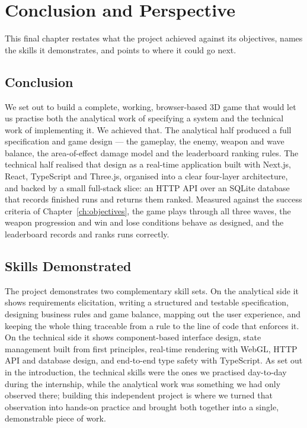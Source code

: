 \documentclass[12pt,a4paper]{report}
\begin{document}
\chapter{Conclusion and Perspective}\label{ch:conclusion}

This final chapter restates what the project achieved against its objectives,
names the skills it demonstrates, and points to where it could go next.

\section{Conclusion}

We set out to build a complete, working, browser-based 3D game that would let us
practise both the analytical work of specifying a system and the technical work
of implementing it. We achieved that. The analytical half produced a full
specification and game design --- the gameplay, the enemy, weapon and wave
balance, the area-of-effect damage model and the leaderboard ranking rules. The
technical half realised that design as a real-time application built with
Next.js, React, TypeScript and Three.js, organised into a clear four-layer
architecture, and backed by a small full-stack slice: an HTTP API over an SQLite
database that records finished runs and returns them ranked. Measured against the
success criteria of Chapter~\ref{ch:objectives}, the game plays through all three
waves, the weapon progression and win and lose conditions behave as designed, and
the leaderboard records and ranks runs correctly.

\section{Skills Demonstrated}

The project demonstrates two complementary skill sets. On the analytical side it
shows requirements elicitation, writing a structured and testable specification,
designing business rules and game balance, mapping out the user experience, and
keeping the whole thing traceable from a rule to the line of code that enforces
it. On the technical side it shows component-based interface design, state
management built from first principles, real-time rendering with WebGL, HTTP API
and database design, and end-to-end type safety with TypeScript. As set out in
the introduction, the technical skills were the ones we practised day-to-day
during the internship, while the analytical work was something we had only
observed there; building this independent project is where we turned that
observation into hands-on practice and brought both together into a single,
demonstrable piece of work.
\end{document}
